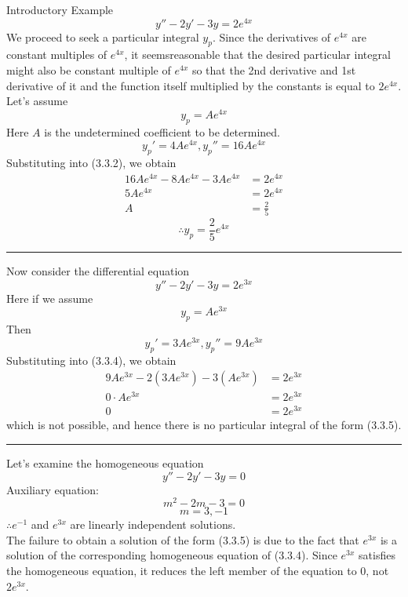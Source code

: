 \begin{example}{Introductory Example}{}
    \begin{equation}
        y'' - 2y' - 3y = 2e^{4x}
    \end{equation}
    We proceed to seek a particular integral $y_p$. Since the derivatives of $e^{4x}$ are constant multiples of $e^{4x}$, it seemsreasonable that the desired particular integral might also be constant multiple of $e^{4x}$ so that the 2nd derivative and 1st derivative of it and the function itself multiplied by the constants is equal to $2e^{4x}$.\\
Let's assume
\begin{equation}
    y_p = Ae^{4x}
\end{equation}
Here $A$ is the undetermined coefficient to be determined. \[
    y_p' = 4Ae^{4x}, y_p'' = 16Ae^{4x}
\] Substituting into (3.3.2), we obtain
\begin{align*}
    16Ae^{4x} - 8Ae^{4x} - 3Ae^{4x} &= 2e^{4x} \\
    5Ae^{4x} &= 2e^{4x} \\
    A &= \frac{2}{5}
\end{align*}
\[ \therefore y_p = \frac{2}{5}e^{4x} \]

\rule{4in}{0.25pt}

Now consider the differential equation
\begin{equation}
    y'' - 2y' - 3y = 2e^{3x}
\end{equation}
Here if we assume
\begin{equation}
    y_p = Ae^{3x}
\end{equation}
Then \[
    y_p' = 3Ae^{3x}, y_p'' = 9Ae^{3x}
\]
Substituting into (3.3.4), we obtain
\begin{align*}
    9Ae^{3x} - 2(3Ae^{3x}) - 3(Ae^{3x}) &= 2e^{3x} \\
    0 \cdot Ae^{3x} &= 2e^{3x} \\
    0 &= 2e^{3x}
\end{align*}
which is not possible, and hence there is no particular integral of the form (3.3.5).

\rule{4in}{0.25pt}

Let's examine the homogeneous equation 
\begin{equation}
    y'' - 2y' - 3y = 0
\end{equation}
Auxiliary equation: \[
    m^2 - 2m - 3 = 0
\] \[ m = 3, -1 \]
$\therefore e^{-1}$ and $e^{3x}$ are linearly independent solutions.\\
The failure to obtain a solution of the form (3.3.5) is due to the fact that  $e^{3x}$ is a solution of the corresponding homogeneous equation of (3.3.4). Since $e^{3x}$ satisfies the homogeneous equation, it reduces the left member of the equation to 0, not $2e^{3x}$.


\end{example}
